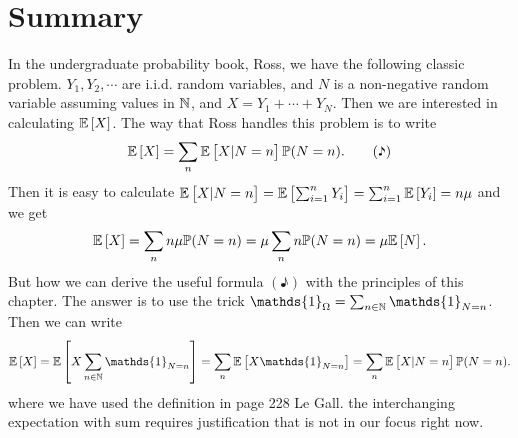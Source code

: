 \section{Summary}

\begin{summary}
	In the undergraduate probability book, Ross, we have the following classic problem. $ Y_1,Y_2,\cdots $ are i.i.d. random variables, and $ N $ is a non-negative random variable assuming values in $ \mathbb{N} $, and $ X = Y_1 + \cdots + Y_N $. Then we are interested in calculating $ \mathbb{E}\left[X\right] $. The way that Ross handles this problem is to write
	\[ \mathbb{E}\left[X\right] = \sum_n\mathbb{E}\left[X|N=n\right] \mathbb{P}(N=n). \tag{\eighthnote} \]
	Then it is easy to calculate $ \mathbb{E}\left[X|N=n\right] = \mathbb{E}\left[\sum_{i=1}^n Y_i\right] = \sum_{i=1}^n \mathbb{E}\left[Y_i\right] = n\mu $ and we get
	\[ \mathbb{E}\left[X\right] = \sum_n n\mu \mathbb{P}(N=n) = \mu \sum_n n \mathbb{P}(N=n) = \mu \mathbb{E}\left[N\right]. \]
	But how we can derive the useful formula $ (\eighthnote) $ with the principles of this chapter. The answer is to use the trick $ \mathds{1}_\Omega = \sum_{n\in\N}\mathds{1}_{N=n} $. Then we can write
	\[ \E{X}=\E{X\sum_{n\in\N}\mathds{1}_{N=n}} = \sum_n \E{X\mathds{1}_{N=n}} = \sum_n \E{X|N=n}\prob(N=n). \]
	where we have used the definition in page 228 Le Gall.
	the interchanging expectation with sum requires justification that is not in our focus right now. 
\end{summary}
